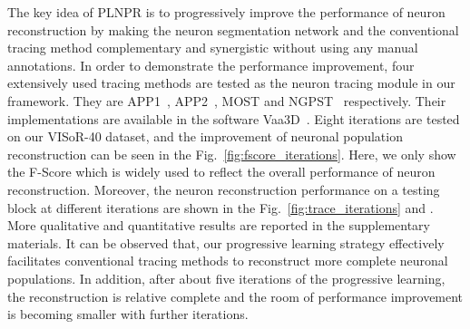 The key idea of PLNPR is to progressively improve the performance of neuron reconstruction by making the neuron segmentation network and the conventional tracing method complementary and synergistic without using any manual annotations.
In order to demonstrate the performance improvement, four extensively used tracing methods are tested as the neuron tracing module in our framework. 
They are APP1~\cite{Peng2011}, APP2~\cite{Xiao2013}, MOST\cite{Wu2014} and NGPST~\cite{Quan2015} respectively. Their implementations are available in the software Vaa3D~\cite{Peng2014}. 
%
Eight iterations are tested on our VISoR-40 dataset, and the improvement of neuronal population reconstruction can be seen in the Fig.~\ref{fig:fscore_iterations}.
Here, we only show the F-Score which is widely used to reflect the overall performance of neuron reconstruction.
Moreover, the neuron reconstruction performance on a testing block at different iterations are shown in the Fig.~\ref{fig:trace_iterations} and .
%
More qualitative and quantitative results are reported in the supplementary materials.
It can be observed that, our progressive learning strategy effectively facilitates conventional tracing methods to reconstruct more complete neuronal populations.
In addition, after about five iterations of the progressive learning, the reconstruction is relative complete and the room of performance improvement is becoming smaller with further iterations.




